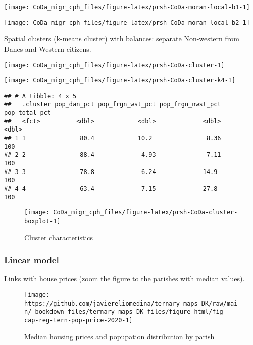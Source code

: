 \documentclass[
  12pt,
]{article}
\begin{document}
\begin{center}\texttt{[image: CoDa\_migr\_cph\_files/figure-latex/prsh-CoDa-moran-local-b1-1]} \end{center}

\begin{center}\texttt{[image: CoDa\_migr\_cph\_files/figure-latex/prsh-CoDa-moran-local-b2-1]} \end{center}

Spatial clusters (k-means cluster) with balances: separate Non-western from Danes and Western citizens.

\begin{center}\texttt{[image: CoDa\_migr\_cph\_files/figure-latex/prsh-CoDa-cluster-1]} \end{center}

\begin{center}\texttt{[image: CoDa\_migr\_cph\_files/figure-latex/prsh-CoDa-cluster-k4-1]} \end{center}

\begin{verbatim}
## # A tibble: 4 x 5
##   .cluster pop_dan_pct pop_frgn_wst_pct pop_frgn_nwst_pct pop_total_pct
##   <fct>          <dbl>            <dbl>             <dbl>         <dbl>
## 1 1               80.4            10.2               8.36           100
## 2 2               88.4             4.93              7.11           100
## 3 3               78.8             6.24             14.9            100
## 4 4               63.4             7.15             27.8            100
\end{verbatim}

\begin{figure}[H]

{\centering \texttt{[image: CoDa\_migr\_cph\_files/figure-latex/prsh-CoDa-cluster-boxplot-1]} 

}

\caption{Cluster characteristics}\label{fig:prsh-CoDa-cluster-boxplot}
\end{figure}

\hypertarget{linear-model}{%
\subsubsection{Linear model}\label{linear-model}}

Links with house prices (zoom the figure to the parishes with median values).

\begin{figure}[H]

{\centering \texttt{[image: https://github.com/javiereliomedina/ternary\_maps\_DK/raw/main/\_bookdown\_files/ternary\_maps\_DK\_files/figure-html/fig-cap-reg-tern-pop-price-2020-1]} 

}

\caption{Median housing prices and popupation distribution by parish}\label{fig:fig-cap-reg-tern-pop-price}
\end{figure}
\end{document}
